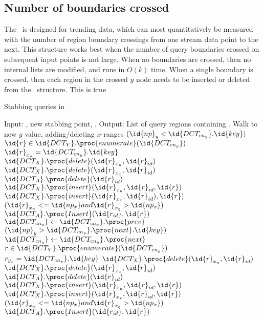 \documentclass{stdbm}
\newcommand{\ct}{\id{DCT}}
\newcommand{\meth}{.}
\newcommand{\inC}[1]{{\id{DCT_{#1}}}}
\newcommand{\X}{{\inC{X}}}
\newcommand{\Y}{{\inC{Y}}}
\newcommand{\A}{{\inC{A}}}
\newcommand{\cny}{{\inC{cn_y}}}
\begin{document}
\subsection{Number of boundaries crossed}
%
The \ct\ is designed for trending data, which can most quantitatively
be measured with the number of region boundary crossings from one
stream data point to the next. This structure works best when the
number of query boundaries crossed on subsequent input points is not
large.  When no boundaries are crossed, then no internal lists are
modified, and  runs in $O(k)$ time.  When a
single boundary is crossed, then each region in the crossed $y$ node
needs to be inserted or deleted from the \X\ structure.  This is true
\begin{algorithm}[htbp]
\label{al:report}
\caption{Stabbing queries in \ct}
\begin{codebox}
\li \Comment Input: , new stabbing point, .
\li \Comment Output: List of query regions containing .
\li \Comment Walk to new $y$ value, adding/deleting $x$-ranges
\li \While $(\id{np}_y < \cny \meth \id{key})$ \label{li:report-y-loop-begin}
\li   \Do {} $\id{r} \in \Y \meth \proc{enumerate}(\cny)$
\li   \If $\id{r}_{x_n} = \cny \meth \id{key}$
\li            \Then $\X \meth \proc{delete}(\id{r}_{x_n},\id{r}_{id})$
\li               $\X \meth \proc{delete}(\id{r}_{x_x},\id{r}_{id})$
\li               $\A \meth \proc{delete}(\id{r}_{id})$
\li            \Else $\X \meth \proc{insert}(\id{r}_{x_n},\id{r}_{id},\id{r})$
\li               $\X \meth \proc{insert}(\id{r}_{x_x},\id{r}_{id}),\id{r})$
\li               \If $(\id{r}_{x_n} <= \id{np_x} and \id{r}_{x_x} > \id{np_x})$
\li                  \Then $\A \meth \proc{Insert}(\id{r_{id}},\id{r})$
                     \End
      \End
\li   $\cny \gets \cny \meth \proc{prev}$
  \End
\li \While $(\id{np}_y > \cny \meth \proc{next} \meth \id{key})$
\li   \Do $\cny \gets \cny \meth \proc{next}$
\li     {} $r \in \Y \meth \proc{enumerate}(\cny)$
\li       \If $r_{y_x} = \cny \meth \id{key}$
\li            \Then $\X \meth \proc{delete}(\id{r}_{x_n},\id{r}_{id})$
\li               $\X \meth \proc{delete}(\id{r}_{x_x},\id{r}_{id})$
\li               $\A \meth \proc{delete}(\id{r}_{id})$
\li            \Else $\X \meth \proc{insert}(\id{r}_{x_n},\id{r}_{id},\id{r})$
\li               $\X \meth \proc{insert}(\id{r}_{x_x},\id{r}_{id},\id{r})$
\li               \If $(\id{r}_{x_n} <= \id{np_x} and \id{r}_{x_x} > \id{np_x})$
\li                  \Then $\A \meth \proc{Insert}(\id{r_{id}},\id{r})$

\end{codebox}
\end{algorithm}
\end{document}
